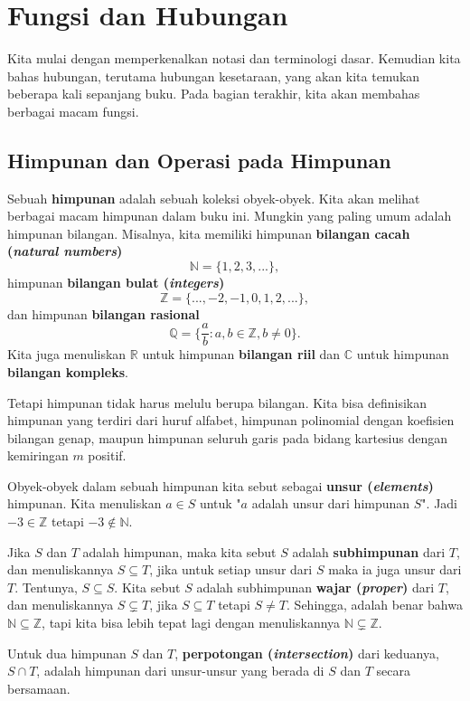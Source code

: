 \chapter{Fungsi dan Hubungan}

Kita mulai dengan memperkenalkan notasi dan terminologi dasar. Kemudian kita bahas hubungan, terutama hubungan kesetaraan, yang akan kita temukan beberapa kali sepanjang buku. Pada bagian terakhir, kita akan membahas berbagai macam fungsi.


\section{Himpunan dan Operasi pada Himpunan}

Sebuah \textbf{himpunan} adalah sebuah koleksi obyek-obyek. Kita akan melihat berbagai macam himpunan dalam buku ini. Mungkin yang paling umum adalah himpunan bilangan. Misalnya, kita memiliki himpunan \textbf{bilangan cacah (\textit{natural numbers})}
\[ \mathbb{N} = \{1,2,3, ...\},\]
himpunan \textbf{bilangan bulat (\textit{integers})}
\[ \mathbb{Z} = \{..., -2, -1, 0, 1, 2, ...\}, \]
dan himpunan \textbf{bilangan rasional}
\[  \mathbb{Q} = \{ \frac{a}{b} : a,b \in \mathbb{Z}, b \neq 0 \}. \]
Kita juga menuliskan $\mathbb{R}$ untuk himpunan \textbf{bilangan riil} dan $\mathbb{C}$ untuk himpunan \textbf{bilangan kompleks}.

Tetapi himpunan tidak harus melulu berupa bilangan. Kita bisa definisikan himpunan yang terdiri dari huruf alfabet, himpunan polinomial dengan koefisien bilangan genap, maupun himpunan seluruh garis pada bidang kartesius dengan kemiringan $m$ positif.

Obyek-obyek dalam sebuah himpunan kita sebut sebagai \textbf{unsur (\textit{elements})} himpunan. Kita menuliskan $a \in S$ untuk "$a$ adalah unsur dari himpunan $S$". Jadi $-3 \in \mathbb{Z}$ tetapi $-3 \notin \mathbb{N}$.

Jika $S$ dan $T$ adalah himpunan, maka kita sebut $S$ adalah \textbf{subhimpunan} dari $T$, dan menuliskannya $S \subseteq T$, jika untuk setiap unsur dari $S$ maka ia juga unsur dari $T$. Tentunya, $S \subseteq S$. Kita sebut $S$ adalah subhimpunan \textbf{wajar (\textit{proper})} dari $T$, dan menuliskannya $S \subsetneq T$, jika $S\subseteq T$ tetapi $S \neq T$. Sehingga, adalah benar bahwa $\mathbb{N} \subseteq \mathbb{Z}$, tapi kita bisa lebih tepat lagi dengan menuliskannya $\mathbb{N} \subsetneq \mathbb{Z}$.

Untuk dua himpunan $S$ dan $T$, \textbf{perpotongan (\textit{intersection})} dari keduanya, $S \cap T$, adalah himpunan dari unsur-unsur yang berada di $S$ dan $T$ secara bersamaan. 

